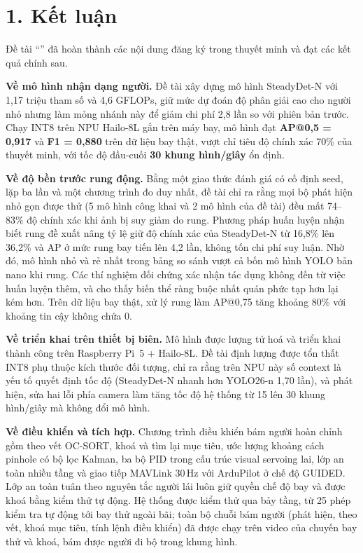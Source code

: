 
\section*{1. Kết luận}

Đề tài ``\tendetai'' đã hoàn thành các nội dung đăng ký trong thuyết minh và đạt các kết quả chính sau.

\textbf{Về mô hình nhận dạng người.} Đề tài xây dựng mô hình SteadyDet-N với 1,17 triệu tham số và 4,6 GFLOPs, giữ mức dự đoán độ phân giải cao cho người nhỏ nhưng làm mỏng nhánh này để giảm chi phí 2,8 lần so với phiên bản trước. Chạy INT8 trên NPU Hailo-8L gắn trên máy bay, mô hình đạt \textbf{AP@0,5 = 0,917} và \textbf{F1 = 0,880} trên dữ liệu bay thật, vượt chỉ tiêu độ chính xác 70\% của thuyết minh, với tốc độ đầu-cuối \textbf{30 khung hình/giây} ổn định.

\textbf{Về độ bền trước rung động.} Bằng một giao thức đánh giá có cố định seed, lặp ba lần và một chương trình đo duy nhất, đề tài chỉ ra rằng mọi bộ phát hiện nhỏ gọn được thử (5 mô hình công khai và 2 mô hình của đề tài) đều mất 74--83\% độ chính xác khi ảnh bị suy giảm do rung. Phương pháp huấn luyện nhận biết rung đề xuất nâng tỷ lệ giữ độ chính xác của SteadyDet-N từ 16,8\% lên 36,2\% và AP ở mức rung bay tiến lên 4,2 lần, không tốn chi phí suy luận. Nhờ đó, mô hình nhỏ và rẻ nhất trong bảng so sánh vượt cả bốn mô hình YOLO bản nano khi rung. Các thí nghiệm đối chứng xác nhận tác dụng không đến từ việc huấn luyện thêm, và cho thấy biến thể ràng buộc nhất quán phức tạp hơn lại kém hơn. Trên dữ liệu bay thật, xử lý rung làm AP@0,75 tăng khoảng 80\% với khoảng tin cậy không chứa 0.

\textbf{Về triển khai trên thiết bị biên.} Mô hình được lượng tử hoá và triển khai thành công trên Raspberry Pi~5 + Hailo-8L. Đề tài định lượng được tổn thất INT8 phụ thuộc kích thước đối tượng, chỉ ra rằng trên NPU này số context là yếu tố quyết định tốc độ (SteadyDet-N nhanh hơn YOLO26-n 1,70 lần), và phát hiện, sửa hai lỗi phía camera làm tăng tốc độ hệ thống từ 15 lên 30 khung hình/giây mà không đổi mô hình.

\textbf{Về điều khiển và tích hợp.} Chương trình điều khiển bám người hoàn chỉnh gồm theo vết OC-SORT, khoá và tìm lại mục tiêu, ước lượng khoảng cách pinhole có bộ lọc Kalman, ba bộ PID trong cấu trúc visual servoing lai, lớp an toàn nhiều tầng và giao tiếp MAVLink 30\,Hz với ArduPilot ở chế độ GUIDED. Lớp an toàn tuân theo nguyên tắc người lái luôn giữ quyền chế độ bay và được khoá bằng kiểm thử tự động. Hệ thống được kiểm thử qua bảy tầng, từ 25 phép kiểm tra tự động tới bay thử ngoài bãi; toàn bộ chuỗi bám người (phát hiện, theo vết, khoá mục tiêu, tính lệnh điều khiển) đã được chạy trên video của chuyến bay thử và khoá, bám được người đi bộ trong khung hình.

